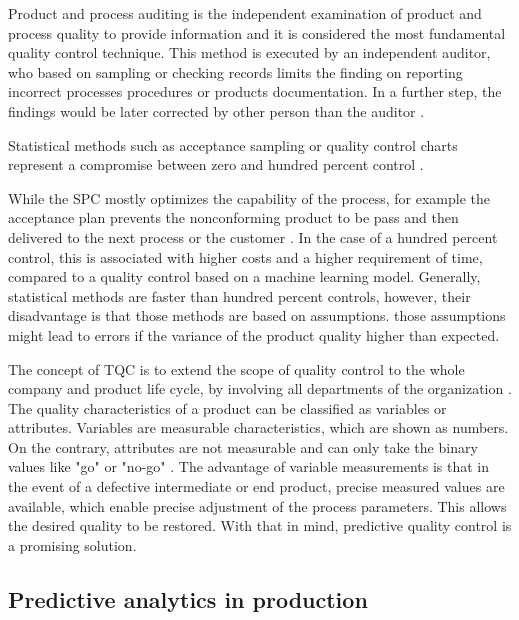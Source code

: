 \documentclass[5p,times,procedia]{elsarticle}
\begin{document}
Product and process auditing is the independent examination of product and process quality to provide information and it is considered the most fundamental quality control technique. This method is executed by
an independent auditor, who based on sampling or checking records limits the finding on reporting incorrect processes procedures or products documentation. In a further step, the findings would be later corrected by other person than the auditor \cite{fox1993quality}. 


Statistical methods such as acceptance sampling or quality control charts represent a compromise between zero and hundred percent control \cite{selvamuthu2018introduction, kurniati2015quality}.

While the SPC mostly optimizes the capability of the process, for example the acceptance plan prevents the nonconforming product to be pass and then delivered to the next process or the customer \cite{kurniati2015quality}.
In the case of a hundred percent control, this is associated with higher costs and a higher requirement of time, compared to a quality control based on a machine learning model.
Generally, statistical methods are faster than hundred percent controls, however, their disadvantage is that those methods are based on assumptions. those assumptions might lead to errors if the variance of the product quality higher than expected.

The concept of TQC is to extend the scope of quality control to the whole company and product life cycle, by involving all departments of the organization \cite{illes2017new}.
The quality characteristics of a product can be classified as variables or attributes.
Variables are measurable characteristics, which are shown as numbers. On the contrary, attributes are not measurable and can only take the binary values like "go" or "no-go" \cite{mitra2016fundamentals}. 
The advantage of variable measurements is that in the event of a defective intermediate or end product, precise measured values are available, which enable precise adjustment of the process parameters. 
This allows the desired quality to be restored. With that in mind, predictive quality control is a promising solution.

\subsection{Predictive analytics in production}
\end{document}
